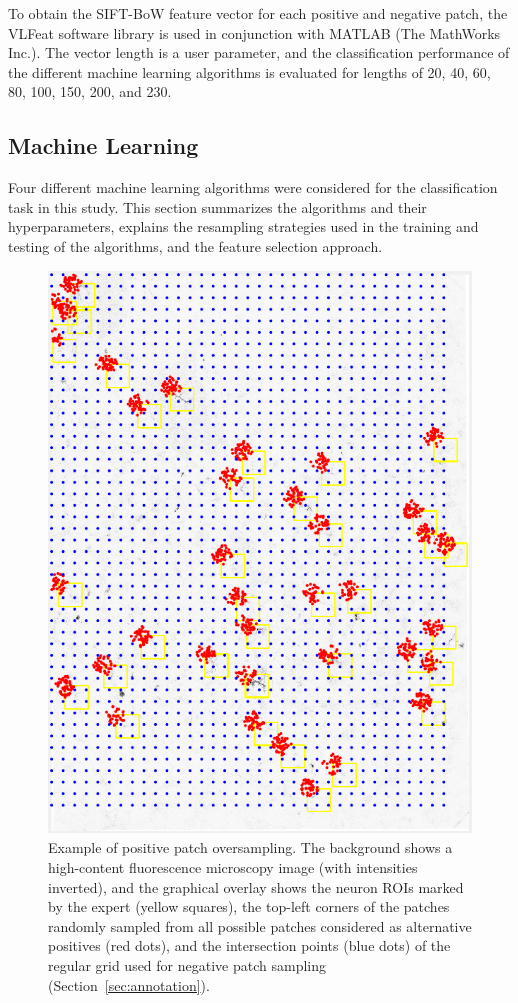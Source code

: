 To obtain the SIFT-BoW feature vector for each positive and negative patch, the VLFeat software library \cite{vedaldi2010vlfeat} is used in conjunction with MATLAB (The MathWorks Inc.). The vector length is a user parameter, and the classification performance of the different machine learning algorithms is evaluated for lengths of 20, 40, 60, 80, 100, 150, 200, and 230.

\subsection{Machine Learning}
\label{subsec:machineLearning}
Four different machine learning algorithms were considered for the classification task in this study. This section summarizes the algorithms and their hyperparameters, explains the resampling strategies used in the training and testing of the algorithms, and the feature selection approach.
\begin{figure}[h!]
	\centering
	\includegraphics[width=0.8\columnwidth]{fig03}
	\caption{Example of positive patch oversampling. The background shows a high-content fluorescence microscopy image (with intensities inverted), and the graphical overlay shows the neuron ROIs marked by the expert (yellow squares), the top-left corners of the patches randomly sampled from all possible patches considered as alternative positives (red dots), and the intersection points (blue dots) of the regular grid used for negative patch sampling (Section~\ref{sec:annotation}).}
	\label{fig:oversampling}
\end{figure}
